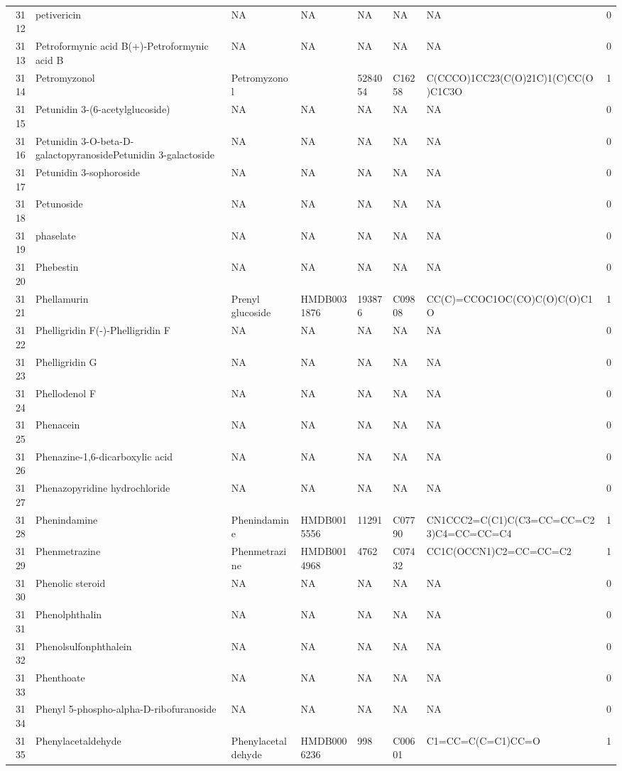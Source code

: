\documentclass[a4paper]{article}
\begin{document}
\begin{longtable}{rlllllll}
  3112 & petivericin & NA & NA & NA & NA & NA & 0 \\ 
  3113 & Petroformynic acid B(+)-Petroformynic acid B & NA & NA & NA & NA & NA & 0 \\ 
  3114 & Petromyzonol & Petromyzonol &  & 5284054 & C16258 & C(CCCO)1CC23(C(O)21C)1(C)CC(O)C1C3O & 1 \\ 
  3115 & Petunidin 3-(6-acetylglucoside) & NA & NA & NA & NA & NA & 0 \\ 
  3116 & Petunidin 3-O-beta-D-galactopyranosidePetunidin 3-galactoside & NA & NA & NA & NA & NA & 0 \\ 
  3117 & Petunidin 3-sophoroside & NA & NA & NA & NA & NA & 0 \\ 
  3118 & Petunoside & NA & NA & NA & NA & NA & 0 \\ 
  3119 & phaselate & NA & NA & NA & NA & NA & 0 \\ 
  3120 & Phebestin & NA & NA & NA & NA & NA & 0 \\ 
  3121 & Phellamurin & Prenyl glucoside & HMDB0031876 & 193876 & C09808 & CC(C)=CCOC1OC(CO)C(O)C(O)C1O & 1 \\ 
  3122 & Phelligridin F(-)-Phelligridin F & NA & NA & NA & NA & NA & 0 \\ 
  3123 & Phelligridin G & NA & NA & NA & NA & NA & 0 \\ 
  3124 & Phellodenol F & NA & NA & NA & NA & NA & 0 \\ 
  3125 & Phenacein & NA & NA & NA & NA & NA & 0 \\ 
  3126 & Phenazine-1,6-dicarboxylic acid & NA & NA & NA & NA & NA & 0 \\ 
  3127 & Phenazopyridine hydrochloride & NA & NA & NA & NA & NA & 0 \\ 
  3128 & Phenindamine & Phenindamine & HMDB0015556 & 11291 & C07790 & CN1CCC2=C(C1)C(C3=CC=CC=C23)C4=CC=CC=C4 & 1 \\ 
  3129 & Phenmetrazine & Phenmetrazine & HMDB0014968 & 4762 & C07432 & CC1C(OCCN1)C2=CC=CC=C2 & 1 \\ 
  3130 & Phenolic steroid & NA & NA & NA & NA & NA & 0 \\ 
  3131 & Phenolphthalin & NA & NA & NA & NA & NA & 0 \\ 
  3132 & Phenolsulfonphthalein & NA & NA & NA & NA & NA & 0 \\ 
  3133 & Phenthoate & NA & NA & NA & NA & NA & 0 \\ 
  3134 & Phenyl 5-phospho-alpha-D-ribofuranoside & NA & NA & NA & NA & NA & 0 \\ 
  3135 & Phenylacetaldehyde & Phenylacetaldehyde & HMDB0006236 & 998 & C00601 & C1=CC=C(C=C1)CC=O & 1 \\ 

\end{longtable}
\end{document}
